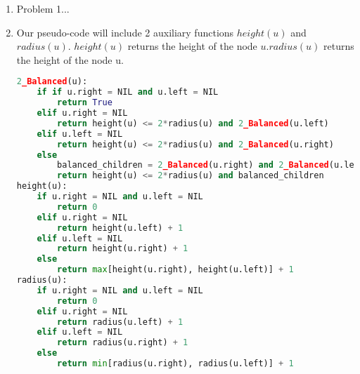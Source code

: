 \documentclass{article}
\begin{document}
\begin{enumerate}
\item Problem 1...
\item 
Our pseudo-code will include 2 auxiliary functions $height(u)$ and $radius(u)$. $height(u)$ returns the height of the node $u$.$radius(u)$ returns the height of the node u.\\
\lstset{numbers=left, numberstyle=\tiny, stepnumber=1, numbersep=5pt}
\begin{lstlisting}[language=Python]
2_Balanced(u): 
    if if u.right = NIL and u.left = NIL
        return True
    elif u.right = NIL 
        return height(u) <= 2*radius(u) and 2_Balanced(u.left)
    elif u.left = NIL
        return height(u) <= 2*radius(u) and 2_Balanced(u.right)
    else
        balanced_children = 2_Balanced(u.right) and 2_Balanced(u.left)
        return height(u) <= 2*radius(u) and balanced_children
height(u):
    if u.right = NIL and u.left = NIL
        return 0
    elif u.right = NIL 
        return height(u.left) + 1
    elif u.left = NIL
        return height(u.right) + 1
    else
        return max[height(u.right), height(u.left)] + 1
radius(u):
    if u.right = NIL and u.left = NIL
        return 0
    elif u.right = NIL 
        return radius(u.left) + 1
    elif u.left = NIL
        return radius(u.right) + 1
    else
        return min[radius(u.right), radius(u.left)] + 1
\end{lstlisting}
\end{enumerate}
\end{document}

